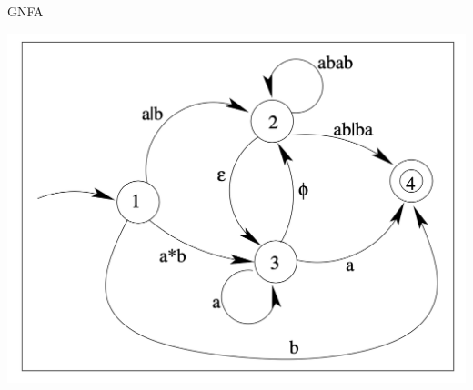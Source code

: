\begin{theo}[GNFA]{GNFA}
\begin{minipage}{.4\textwidth}
        \includegraphics[scale = 0.35]{Images/GNFA.png}
    \end{minipage}
\end{theo}

\newpage

